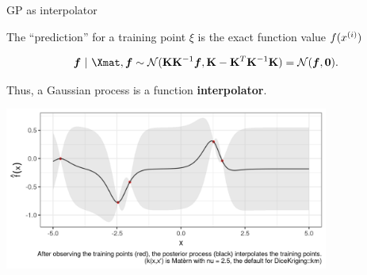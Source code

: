\begin{vbframe}{GP as interpolator}

The \enquote{prediction} for a training point $\xi$ is the exact function value $f(x^{(i)})$

\vspace*{-0.8cm}

\begin{eqnarray*}
\bm{f} ~|~ \Xmat, \bm{f} \sim \mathcal{N}(\Kmat\Kmat^{-1}\bm{f}, \Kmat - \Kmat^T \Kmat^{-1} \Kmat) = \mathcal{N}(\bm{f}, \bm{0}).
\end{eqnarray*}

Thus, a Gaussian process is a function \textbf{interpolator}.

\begin{center}
\includegraphics[width=0.8\textwidth]{figure_man/gp-interpolator.png}
\end{center}

\end{vbframe}


